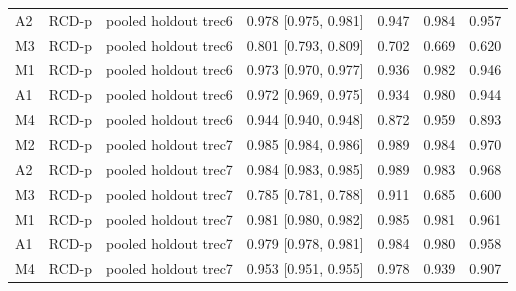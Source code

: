 \begin{table}[!htbp]
\begin{tabular}{lllcccc}
A2 & RCD-p & pooled holdout trec6 & 0.978 [0.975, 0.981] & 0.947 & 0.984 & 0.957 \\
M3 & RCD-p & pooled holdout trec6 & 0.801 [0.793, 0.809] & 0.702 & 0.669 & 0.620 \\
M1 & RCD-p & pooled holdout trec6 & 0.973 [0.970, 0.977] & 0.936 & 0.982 & 0.946 \\
A1 & RCD-p & pooled holdout trec6 & 0.972 [0.969, 0.975] & 0.934 & 0.980 & 0.944 \\
M4 & RCD-p & pooled holdout trec6 & 0.944 [0.940, 0.948] & 0.872 & 0.959 & 0.893 \\
M2 & RCD-p & pooled holdout trec7 & 0.985 [0.984, 0.986] & 0.989 & 0.984 & 0.970 \\
A2 & RCD-p & pooled holdout trec7 & 0.984 [0.983, 0.985] & 0.989 & 0.983 & 0.968 \\
M3 & RCD-p & pooled holdout trec7 & 0.785 [0.781, 0.788] & 0.911 & 0.685 & 0.600 \\
M1 & RCD-p & pooled holdout trec7 & 0.981 [0.980, 0.982] & 0.985 & 0.981 & 0.961 \\
A1 & RCD-p & pooled holdout trec7 & 0.979 [0.978, 0.981] & 0.984 & 0.980 & 0.958 \\
M4 & RCD-p & pooled holdout trec7 & 0.953 [0.951, 0.955] & 0.978 & 0.939 & 0.907 \\
\hline\hline
\end{tabular}
\end{table}